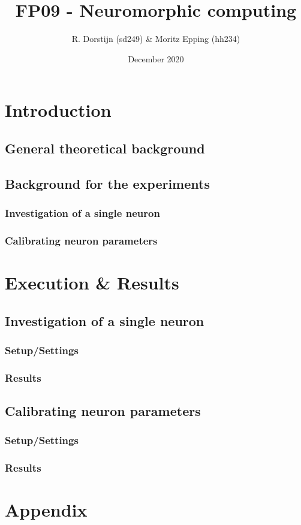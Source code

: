 \documentclass[a4paper]{article}
\title{FP09 - Neuromorphic computing}
\author{R. Dorstijn (sd249) \& Moritz Epping (hh234)}
\date{December 2020}
\begin{document}
\maketitle

\section{Introduction}
\subsection{General theoretical background}

\subsection{Background for the experiments}
\subsubsection{Investigation of a single neuron}
\subsubsection{Calibrating neuron parameters}

\section{Execution \& Results}

\subsection{Investigation of a single neuron}
\subsubsection{Setup/Settings}
\subsubsection{Results}

\subsection{Calibrating neuron parameters}
\subsubsection{Setup/Settings}
\subsubsection{Results}

\section{Appendix}
\end{document}
